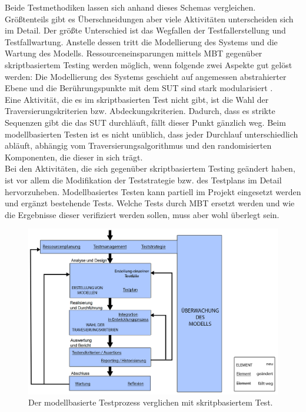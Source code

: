Beide Testmethodiken lassen sich anhand dieses Schemas vergleichen. Größtenteils gibt es Überschneidungen aber viele Aktivitäten unterscheiden sich im Detail. Der größte Unterschied ist das Wegfallen der Testfallerstellung und Testfallwartung. Anstelle dessen tritt die Modellierung des Systems und die Wartung des Modells. Ressourceneinsparungen mittels \Gls{MBT} gegenüber skriptbasiertem Testing werden möglich, wenn folgende zwei Aspekte gut gelöst werden: Die Modellierung des Systems geschieht auf angemessen abstrahierter Ebene und die Berührungspunkte mit dem \Gls{SUT} sind stark modularisiert \cite{utting_practical_2007}.\\
Eine Aktivität, die es im skriptbasierten Test nicht gibt, ist die Wahl der Traversierungskriterien bzw. Abdeckungskriterien. Dadurch, dass es strikte Sequenzen gibt die das \Gls{SUT} durchläuft, fällt dieser Punkt gänzlich weg. Beim modellbasierten Testen ist es nicht unüblich, dass jeder Durchlauf unterschiedlich abläuft, abhängig vom Traversierungsalgorithmus und den randomisierten Komponenten, die dieser in sich trägt.\\
Bei den Aktivitäten, die sich gegenüber skriptbasiertem Testing geändert haben, ist vor allem die Modifikation der Teststrategie bzw. des Testplans im Detail hervorzuheben. Modellbasiertes Testen kann partiell im Projekt eingesetzt werden und ergänzt bestehende Tests. Welche Tests durch \Gls{MBT} ersetzt werden und wie die Ergebnisse dieser verifiziert werden sollen, muss aber wohl überlegt sein.

\begin{figure}[h] 
  \hspace*{-0.7cm}
     \includegraphics[width=1.1\textwidth]{figures/mbt_vergleich_skript.png}
  \caption{Der modellbasierte Testprozess verglichen mit skritpbasiertem Test.}
  \label{fig:script_vs_mbt}
\end{figure}

